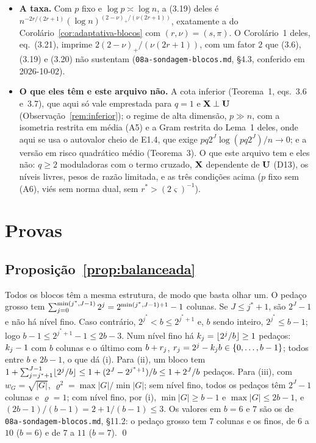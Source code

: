 \documentclass[11pt,a4paper]{article}
\newcommand{\jst}{j^{*}}
\begin{document}
\begin{itemize}[leftmargin=*]
    polinomial, $2^{J_{n}} \asymp n^{c}$, mas com $c \ge s/((2s+1)\seff)$,
    que fica abaixo de $1/2$ quando $\pi \ge 2$ e $s > 1/2$.
  \item \textbf{A taxa.} Com $p$ fixo e $\log p \asymp \log n$, a (3.19)
    deles é $n^{-2r/(2r+1)}(\log n)^{(2-\nu)_{+}/(\nu(2r+1))}$, exatamente a do
    Corolário~\ref{cor:adaptativa-blocos} com $(r,\nu) = (s,\pi)$. O
    Corolário~1 deles, eq.~(3.21), imprime $2(2-\nu)_{+}/(\nu(2r+1))$, com um
    fator $2$ que (3.6), (3.19) e (3.20) não sustentam
    (\texttt{08a-sondagem-blocos.md}, §4.3, conferido em 2026-10-02).
  \item \textbf{O que eles têm e este arquivo não.} A cota inferior
    (Teorema~1, eqs.~3.6 e~3.7), que aqui só vale emprestada para $q = 1$ e
    $\mathbf{X}\perp\mathbf{U}$ (Observação~\ref{rem:inferior}); o regime de alta dimensão,
    $p \gg n$, com a isometria restrita em média (A5) e a Gram restrita do
    Lema~1 deles, onde aqui se usa o autovalor cheio de E1.4, que exige
    $pq2^{J}\log(pq2^{J})/n \to 0$; e a versão em risco quadrático médio
    (Teorema~3). O que este arquivo tem e eles não: $q \ge 2$ moduladoras com o
    termo cruzado, $\mathbf{X}$ dependente de $\mathbf{U}$ (D13), os níveis livres, pesos de
    razão limitada, e as três condições acima ($p$ fixo sem (A6), viés sem
    norma dual, sem $r^{*} > (2\varsigma)^{-1}$).
\end{itemize}

\section{Provas}\label{sec:provas}

\subsection*{Proposição~\ref{prop:balanceada}}

Todos os blocos têm a mesma estrutura, de modo que basta olhar um. O pedaço
grosso tem $\sum_{\lev=0}^{\min(\jst,J-1)}2^{\lev} = 2^{\min(\jst,J-1)+1}-1$
colunas. Se $J \le \jst+1$, são $2^{J}-1$ e não há nível fino. Caso
contrário, $2^{\jst} < b \le 2^{\jst+1}$ e, $b$ sendo inteiro,
$2^{\jst} \le b-1$; logo $b - 1 \le 2^{\jst+1}-1 \le 2b-3$. Num nível fino há
$k_{j} = \lfloor 2^{j}/b\rfloor \ge 1$ pedaços: $k_{j}-1$ com $b$
colunas e o último com $b + r_{j}$, $r_{j} = 2^{j} - k_{j}b \in
\{0,\dots,b-1\}$; todos entre $b$ e $2b-1$, o que dá (i). Para (ii), um bloco
tem $1 + \sum_{\lev=\jst+1}^{J-1}\lfloor 2^{\lev}/b\rfloor \le 1 +
(2^{J}-2^{\jst+1})/b \le 1 + 2^{J}/b$ pedaços. Para (iii), com
$w_{G} = \sqrt{|G|}$, $\varrho^{2} = \max|G|/\min|G|$; sem nível fino, todos os
pedaços têm $2^{J}-1$ colunas e $\varrho = 1$; com nível fino, por (i),
$\min|G| \ge b-1$ e $\max|G| \le 2b-1$, e $(2b-1)/(b-1) = 2 + 1/(b-1) \le 3$.
Os valores em $b = 6$ e $7$ são os de \texttt{08a-sondagem-blocos.md},
§11.2: o pedaço grosso tem $7$ colunas e os finos, de $6$ a $10$ ($b = 6$) e
de $7$ a $11$ ($b = 7$). \qed
\end{document}
